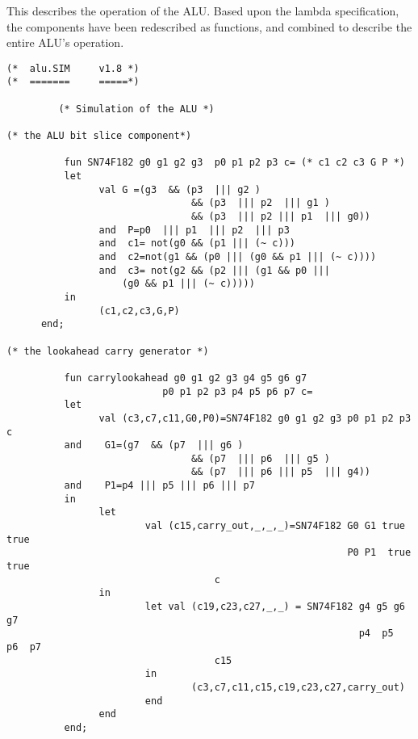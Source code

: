 This describes the operation of the ALU.
Based upon the lambda specification, the components have been redescribed as
functions, and combined to describe the entire ALU's operation.
\begin{verbatim}
(*	alu.SIM		v1.8 *)
(*	=======		=====*)

         (* Simulation of the ALU *)

(* the ALU bit slice component*)

          fun SN74F182 g0 g1 g2 g3  p0 p1 p2 p3 c= (* c1 c2 c3 G P *)
          let
                val G =(g3  && (p3  ||| g2 )
                                && (p3  ||| p2  ||| g1 )
                                && (p3  ||| p2 ||| p1  ||| g0))
                and  P=p0  ||| p1  ||| p2  ||| p3
                and  c1= not(g0 && (p1 ||| (~ c)))
                and  c2=not(g1 && (p0 ||| (g0 && p1 ||| (~ c))))
                and  c3= not(g2 && (p2 ||| (g1 && p0 ||| 
					(g0 && p1 ||| (~ c)))))
          in
                (c1,c2,c3,G,P)
	  end;

(* the lookahead carry generator *)

          fun carrylookahead g0 g1 g2 g3 g4 g5 g6 g7
                           p0 p1 p2 p3 p4 p5 p6 p7 c=
          let 
                val (c3,c7,c11,G0,P0)=SN74F182 g0 g1 g2 g3 p0 p1 p2 p3 c
          and    G1=(g7  && (p7  ||| g6 )
                                && (p7  ||| p6  ||| g5 )
                                && (p7  ||| p6 ||| p5  ||| g4))
          and    P1=p4 ||| p5 ||| p6 ||| p7
          in
                let
                        val (c15,carry_out,_,_,_)=SN74F182 G0 G1 true true
                                                           P0 P1  true true
          							c
                in
                        let val (c19,c23,c27,_,_) = SN74F182 g4 g5 g6 g7
                                                             p4  p5  p6  p7
          							c15
                        in
                                (c3,c7,c11,c15,c19,c23,c27,carry_out)
                        end
                end
          end;



\end{verbatim}
